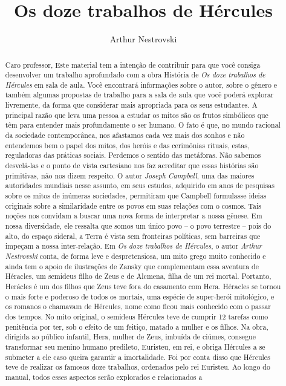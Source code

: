 \documentclass[11pt]{extarticle}
\newcommand{\AutorLivro}{Arthur Nestrovski}
\newcommand{\TituloLivro}{Os doze trabalhos de Hércules}
\newcommand{\colaborador}{Gabriela Karam}
\begin{document}
\title{\TituloLivro}
\author{\AutorLivro}
\def\authornotes{\colaborador}

\date{}
\maketitle


\tableofcontents


\begin{abstract}

Caro professor,
Este material tem a intenção de contribuir para que você consiga desenvolver um trabalho aprofundado com a obra História de \textit{Os doze trabalhos de Hércules} em sala de aula. Você encontrará informações sobre o autor, sobre o gênero e também algumas propostas de trabalho para a sala de aula que você poderá explorar livremente, da forma que considerar mais apropriada para os seus estudantes. A principal razão que leva uma pessoa a estudar os mitos são os frutos simbólicos que têm para entender mais profundamente o ser humano. O fato é que, no mundo racional da sociedade contemporânea, nos afastamos cada vez mais dos sonhos e não entendemos bem o papel dos mitos, dos heróis e das cerimônias rituais, estas, reguladoras das práticas sociais. Perdemos o sentido das metáforas. Não sabemos desvelá-las e o ponto de vista cartesiano nos faz acreditar que essas histórias são primitivas, não nos dizem respeito. O autor \textit{Joseph Campbell}, uma das maiores autoridades mundiais nesse assunto, em seus estudos, adquirido em anos de pesquisas sobre os mitos de inúmeras sociedades, permitiram que Campbell formulasse ideias originais sobre a similaridade entre os povos em suas relações com o cosmos. Tais noções nos convidam a buscar uma nova forma de interpretar a nossa gênese. Em nossa diversidade, ele ressalta que somos um único povo – o povo terrestre – pois do alto, do espaço sideral, a Terra é vista sem fronteiras políticas, sem barreiras que impeçam a nossa inter-relação. Em \textit{Os doze trabalhos de Hércules}, o autor \textit{Arthur Nestrovski} conta, de forma leve e despretensiosa, um mito grego muito conhecido e ainda tem o apoio de ilustrações de Zansky que complementam essa aventura de Héracles, um semideus filho de Zeus e de Alcmena, filha de um rei mortal. Portanto, Herácles é um dos filhos que Zeus teve fora do casamento com Hera. Héracles se tornou o mais forte e poderoso de todos os mortais, uma espécie de super-herói mitológico, e os romanos o chamavam de Hércules, nome como ficou mais conhecido com o passar dos tempos. No mito original, o semideus Hércules teve de cumprir 12 tarefas como penitência por ter, sob o efeito de um feitiço, matado a mulher e os filhos. Na obra, dirigida ao público infantil, Hera, mulher de Zeus, imbuída de ciúmes, consegue transformar seu menino humano predileto, Euristeu, em rei, e obriga Hércules a se submeter a ele caso queira garantir a imortalidade. Foi por conta disso que Hércules teve de realizar os famosos doze trabalhos, ordenados pelo rei Euristeu. Ao longo do manual, todos esses aspectos serão explorados e relacionados a 
\end{abstract}
\end{document}
